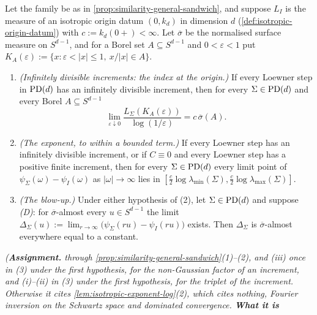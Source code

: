 \begin{proposition}
\label{prop:similarity-general-index-zero}
\leanok
Let the family be as in \ref{prop:similarity-general-sandwich}, and suppose $L_I$ is the \Levy{} measure of
an isotropic origin datum $(0, k_d)$ in dimension $d$ (\ref{def:isotropic-origin-datum}) with
$c := k_d(0{+}) < \infty$. Let $\overline\sigma$ be the normalised surface measure on $S^{d-1}$, and for a Borel
set $A \subseteq S^{d-1}$ and $0 < \varepsilon < 1$ put $K_A(\varepsilon) := \{x : \varepsilon < |x| \le 1,\ x/|x| \in A\}$.
\begin{enumerate}
\item \emph{(Infinitely divisible increments: the index at the origin.)} If every Loewner step in $\mathrm{PD}(d)$ has
an infinitely divisible increment, then for every $\Sigma \in \mathrm{PD}(d)$ and every Borel $A \subseteq S^{d-1}$
\[
  \lim_{\varepsilon\downarrow0}\frac{L_\Sigma(K_A(\varepsilon))}{\log(1/\varepsilon)} = c\,\overline\sigma(A) .
\]
\item \emph{(The exponent, to within a bounded term.)} If every Loewner step has an infinitely divisible
increment, or if $C \equiv 0$ and every Loewner step has a positive finite increment, then for every
$\Sigma \in \mathrm{PD}(d)$ every limit point of $\psi_\Sigma(\omega) - \psi_I(\omega)$ as $|\omega| \to \infty$ lies in
$[\tfrac c2\log\lambda_{\min}(\Sigma), \tfrac c2\log\lambda_{\max}(\Sigma)]$.
\item \emph{(The blow-up.)} Under either hypothesis of (2), let $\Sigma \in \mathrm{PD}(d)$ and suppose
\emph{(D)}: for $\overline\sigma$-almost every $u \in S^{d-1}$ the limit
$\Delta_\Sigma(u) := \lim_{r\to\infty}\bigl(\psi_\Sigma(ru) - \psi_I(ru)\bigr)$ exists. Then $\Delta_\Sigma$ is
$\overline\sigma$-almost everywhere equal to a constant.
\end{enumerate}
\statusA\quad{}\quad\emph{(\textbf{Assignment.}  through
\ref{prop:similarity-general-sandwich}(1)--(2), and (iii) once in (3) under the first hypothesis,
for the non-Gaussian factor of an increment, and (i)--(ii) in (3) under the first hypothesis, for the
triplet of the increment. Otherwise it cites \ref{lem:isotropic-exponent-log}(2), which
cites nothing, Fourier inversion on the Schwartz space and dominated convergence. \textbf{What it is
}}
\end{proposition}
